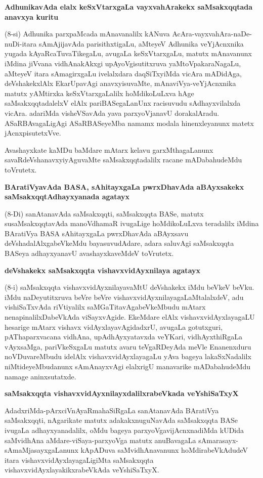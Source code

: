 \noindent
\textbf{AdhunikavAda elalx keSxVtarxgaLa vayxvahArakekx saMsakxqqtada anavxya kuritu}\label{page36}

(8-si) Adhunika parxpaMcada mAnavanalilx kANuva AcAra-vayxvahAra-naDe-nuDi-itara sAmAjijavAda parisithxtigaLu, aMteyeV Adhunika veYjAcnxnika yugada kAyaRcaTuvaTikegaLu, avugaLa keSxVtarxgaLu, matutx mAnavanunx iMdina jiVvana vidhAnakAkxgi upAyoVgisutitxruva yaMtoVpakaraNagaLu, aMteyeV itara sAmagirxgaLu ivelalxdara daqSiTxyiMda vicAra mADidAga, deVshakekxlAlx EkarUpavAgi anavxyisuvaMte, mAnaviVya-veYjAcnxnika matutx yAMtirxka keSxVtarxgaLalilx hoMdikoLuLxva hAge saMsakxqqtadalelxV elAlx pariBASegaLanUnx racisuvudu sAdhayxvilalxda vicAra. adariMda visheVSavAda yava parxyoVjanavU dorakalAradu. ASaRBAvagaLigAgi ASaRBASeyeMba namamx modala hinenxleyanunx matetx jAcnxpisutetxVve.

Avashayxkate kaMDu baMdare mAtarx kelavu garxMthagaLanunx savaRdeVshanavxyiyAguvaMte saMsakxqqtadalilx racane mADabahudeMdu toVrutetx.

\noindent
\textbf{BAratiVyavAda BASA, sAhitayxgaLa pwrxDhavAda aBAyxsakekx saMsakxqqtAdhayxyanada agatayx}\label{page37}

(8-Di) sanAtanavAda saMsakxqqti, saMsakxqqta BASe, matutx susaMsakxqqtavAda manoVdhamaR ivugaLige hoMdikoLuLxva teradalilx iMdina BAratiVya BASA sAhitayxgaLa pwrxDhavAda aBAyxsavu deVshadalAlxgabeVkeMdu bayasuvudAdare, adara saluvAgi saMsakxqqta BASeya adhayxyanavU avashayxkaveMdeV toVrutetx.

\noindent
\textbf{deVshakekx saMsakxqqta vishavxvidAyxnilaya agatayx}\label{page37}

(8-i) saMsakxqqta vishavxvidAyxnilayavaMtU deVshakekx iMdu beVkeV beVku. iMdu naDeyutitxruva beVre beVre vishavxvidAyxnilayagaLaMtalalxdeV, adu vishiSaTxvAda riVtiyalilx saMGaTitavAgabeVkeMbudu mAtarx nenapinalilxDabeVkAda viSayxvAgide. EkeMdare elAlx vishavxvidAyxlayagaLU hesarige mAtarx vishavx vidAyxlayavAgidadxrU, avugaLa gotutxguri, pAThaparxvacana vidhAna, upAdhAyxyatavxda veYKari, vidhAyxthiRgaLa vAyxsaMga, pariVkeSxgaLu matutx avaru teVgaRDeyAda meVle Enanenxduru noVDuvareMbudu idelAlx vishavxvidAyxlayagaLu yAva bageya lakaSxNadalilx niMtideyeMbudanunx sAmAnayxvAgi elalxrigU manavarike mADabahudeMdu namage aninxsutatxde.

\noindent
\textbf{saMsakxqqta vishavxvidAyxnilayxdalilxrabeVkada veYshiSaTxyX}\label{page37}

AdadxriMda-pArxciVnAyaRmahaSiRgaLa sanAtanavAda BAratiVya saMsakxqqti, nAgarikate matutx adakakxnuguNavAda saMsakxqqta BASe ivugaLa adhayxyanadalilx, oMdu bageya parxyoVgavijAcnxnadiMda kUDida saMvidhAna aMdare-viSaya-parxyoVga matutx anuBavagaLa sAmarasayx-sAmaMjasayxgaLanunx kApADuva saMvidhAnavanunx hoMdirabeVkAdudeV itara vishavxvidAyxlayagaLigiMta saMsakxqqta vishavxvidAyxlayakikxrabeVkAda veYshiSaTxyX.

